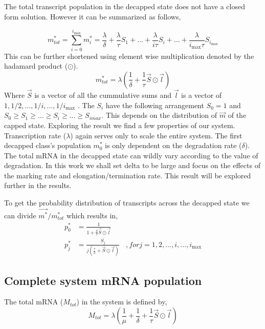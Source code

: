 \documentclass[review]{elsarticle}
\newcommand{\imax}{\ensuremath{i_{\max}}\xspace}
\begin{document}
The total transcript population in the decapped state does not have a closed form solution. However it can be summarized as follows,

\begin{equation}
	m_{tot}^{*} = \sum_{i=0}^{\imax} m_{i}^{*} = \frac{\lambda}{\delta} + \frac{\lambda}{\tau}S_{1} + \hdots + \frac{\lambda}{i \tau}S_{i} + \hdots  + \frac{\lambda}{\imax \tau}S_{\imax} 
\end{equation}
This can be further shortened using element wise multiplication denoted by the hadamard product ($\odot$).
\begin{equation} \label{eq: marked_total_pop} 
	m_{tot}^{*} = \lambda(\frac{1}{\delta} + \frac{1}{\tau}\vec{S} \odot \vec{l}	) 
\end{equation}
Where $\vec{S}$ is a vector of all the cummulative sums and $\vec{l}$ is a vector of $1,1/2,...,1/i,...,1/\imax$ . The $S_{i}$ have the following arrangement $S_{0}=1$ and $ S_{0} \ge S_{1} \ge ... \ge S_{i} \ge ... \ge S_{imax}$. This depends on the distribution of $\vec{m}$ of the capped state. Exploring the result we find a few properties of our system. Transcription rate ($\lambda$) again serves only to scale the entire system. The first decapped class's population $m_{0}^{*}$ is only dependent on the degradation rate ($\delta$). The total mRNA in the decapped state can wildly vary according to the value of degradation. In this work we shall set delta to be large and focus on the effects of the marking rate and elongation/termination rate. This result will be explored further in the results.

To get the probability distribution of transcripts across the decapped state we can divide $\vec{m^{*}}/m_{tot}^{*}$ which results in,
\begin{align*}
	p_{0}^{*} &= \frac{1}{1 + \frac{\delta}{\tau}\vec{S} \odot \vec{l}}	\\
  	p_{j}^{*} &= \frac{S_{j}}{j(\frac{\tau}{\delta} + \vec{S} \odot \vec{l})}	\:\:\:\:, for j=1, 2, ..., i, ..., \imax
\end{align*}






\subsection{Complete system mRNA population}
The total mRNA ($M_{tot}$) in the system is defined by,
\begin{equation}
	M_{tot} = \lambda(\frac{1}{\mu} + \frac{1}{\delta} + \frac{1}{\tau}\vec{S} \odot \vec{l}	) 
\end{equation}
\end{document}
